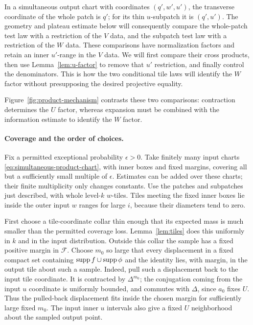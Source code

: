 In a simultaneous output chart with coordinates \((q',w',u')\),
the transverse coordinate of the whole patch is \(q'\);
for its thin \(u\)-subpatch it is \((q',u')\).
The geometry and plateau estimate below will consequently compare
the whole-patch test law with a restriction of the \(V\) data,
and the subpatch test law with a restriction of the \(W\) data.
These comparisons have normalization factors and retain an inner
\(u'\)-range in the \(V\) data.  We will first compare their cross
products, then use Lemma~\ref{lem:u-factor} to remove that \(u'\)
restriction, and finally control the denominators.  This is how
the two conditional tile laws will identify the \(W\) factor
without presupposing the desired projective equality.

Figure~\ref{fig:product-mechanism} contrasts these two comparisons:
contraction determines the \(U\) factor, whereas expansion must be
combined with the information estimate to identify the \(W\) factor.


\paragraph{Coverage and the order of choices.}
Fix a permitted exceptional probability \(\epsilon>0\).
Take finitely many input charts
\eqref{eq:simultaneous-product-chart}, with inner boxes and fixed
margins, covering all but a sufficiently small multiple of
\(\epsilon\).  Estimates can be added over these charts; their
finite multiplicity only changes constants.
Use the patches and subpatches just described, with whole
level-\(k\) \(w\)-tiles.  Tiles meeting
the fixed inner boxes lie inside the outer input \(w\) ranges for
large \(i\), because their diameters tend to zero.

First choose a tile-coordinate collar thin enough that its
expected mass is much smaller than the permitted coverage loss.
Lemma~\ref{lem:tiles} does this uniformly in \(k\) and in the input
distribution.  Outside this collar the sample has a fixed
positive margin in \(\mathcal F\).  Choose \(m_0\) so large that
every displacement in a fixed compact set containing
\(\operatorname{supp} f\cup\operatorname{supp}\phi\) and the identity lies, with margin, in
the output tile about such a sample.
Indeed, pull such a displacement back to the input tile
coordinate.  It is contracted by \(\Delta^{m_0}\); the
conjugation coming from the input \(u\) coordinate is uniformly
bounded, and commutes with \(\Delta\), since \(a_0\) fixes \(U\).
Thus the pulled-back displacement fits inside the chosen margin
for sufficiently large fixed \(m_0\).
The input inner \(u\) intervals also give a fixed \(U\)
neighborhood about the sampled output point.

